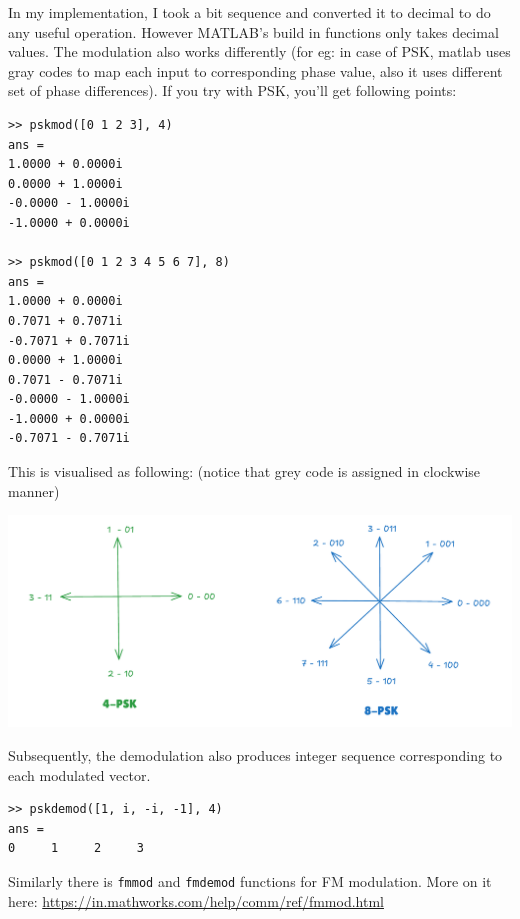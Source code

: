 \begin{tcolorbox}[breakable, title=More on Matlab's build-in modulators \& demodulators]
	In my implementation, I took a bit sequence and converted it to decimal to do any useful operation. However MATLAB's build in functions only takes decimal values. The modulation also works differently (for eg: in case of PSK, matlab uses gray codes to map each input to corresponding phase value, also it uses different set of phase differences). If you try with PSK, you'll get following points: 
\begin{verbatim}
>> pskmod([0 1 2 3], 4)
ans =
1.0000 + 0.0000i
0.0000 + 1.0000i
-0.0000 - 1.0000i
-1.0000 + 0.0000i

>> pskmod([0 1 2 3 4 5 6 7], 8)
ans =
1.0000 + 0.0000i
0.7071 + 0.7071i
-0.7071 + 0.7071i
0.0000 + 1.0000i
0.7071 - 0.7071i
-0.0000 - 1.0000i
-1.0000 + 0.0000i
-0.7071 - 0.7071i
\end{verbatim}

This is visualised as following: (notice that grey code is assigned in clockwise manner)

\begin{minipage}[t]{\textwidth}
		\centering
		\includegraphics[width=0.9\linewidth]{img/psk_diag.pdf}
\end{minipage}

Subsequently, the demodulation also produces integer sequence corresponding to each modulated vector.

\begin{verbatim}
>> pskdemod([1, i, -i, -1], 4)
ans =
0     1     2     3
\end{verbatim}

Similarly there is \texttt{fmmod} and \texttt{fmdemod} functions for FM modulation. More on it here:
\href{https://in.mathworks.com/help/comm/ref/fmmod.html}{https://in.mathworks.com/help/comm/ref/fmmod.html}
	
\end{tcolorbox}
